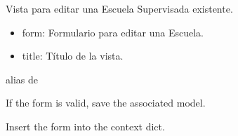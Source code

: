 \documentclass[letterpaper,10pt,spanish]{sphinxmanual}
\begin{document}
\begin{fulllineitems}

\pysigstartsignatures
{}
\pysigstopsignatures
\sphinxAtStartPar
Vista para editar una Escuela Supervisada existente.
\begin{description}
\begin{itemize}
\item {} 
\sphinxAtStartPar
form: Formulario para editar una Escuela.

\item {} 
\sphinxAtStartPar
title: Título de la vista.

\end{itemize}

\end{description}


\begin{fulllineitems}

\pysigstartsignatures
{}
\pysigstopsignatures
\sphinxAtStartPar
alias de 

\end{fulllineitems}



\begin{fulllineitems}

\pysigstartsignatures
{}
\pysigstopsignatures
\sphinxAtStartPar
If the form is valid, save the associated model.

\end{fulllineitems}



\begin{fulllineitems}

\pysigstartsignatures
{}
\pysigstopsignatures
\sphinxAtStartPar
Insert the form into the context dict.

\end{fulllineitems}



\begin{fulllineitems}


\end{fulllineitems}
\end{fulllineitems}
\end{document}
